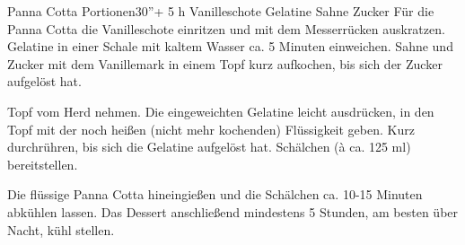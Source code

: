 \begin{MyRecipe}{Panna Cotta}{ Portionen}{30''+ 5 h}
	\ingredient[\Calc{1}{\x}]{} {Vanilleschote}
	 {Gelatine}
	\ingredient[\Calc{0.4}{\x}]{\si{\kilogram}} {Sahne}
	\ingredient[\Calc{120}{\x}]{\si{\gram}} {Zucker}
	Für die Panna Cotta die Vanilleschote einritzen und mit dem Messerrücken auskratzen. Gelatine in einer Schale mit kaltem Wasser ca. 5 Minuten einweichen. Sahne und Zucker mit dem Vanillemark in einem Topf kurz aufkochen, bis sich der Zucker aufgelöst hat.\par\bigskip
	Topf vom Herd nehmen. Die eingeweichten Gelatine leicht ausdrücken, in den Topf mit der noch heißen (nicht mehr kochenden) Flüssigkeit geben. Kurz durchrühren, bis sich die Gelatine aufgelöst hat. Schälchen (à ca. 125 ml) bereitstellen.\par\bigskip
	Die flüssige Panna Cotta hineingießen und die Schälchen ca. 10-15 Minuten abkühlen lassen. Das Dessert anschließend mindestens 5 Stunden, am besten über Nacht, kühl stellen.\par\bigskip
\end{MyRecipe}